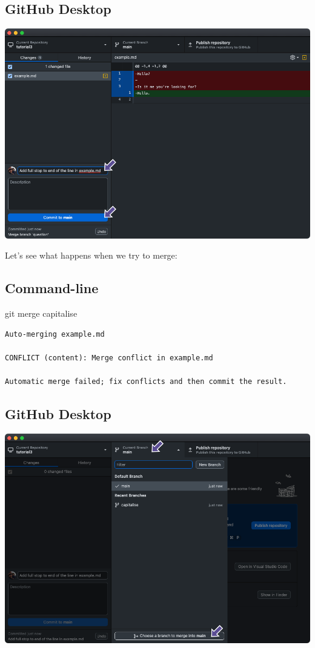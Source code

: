\documentclass[
  letterpaper,
  DIV=11,
  numbers=noendperiod]{scrartcl}
\newenvironment{Shaded}{\begin{snugshade}}{\end{snugshade}}
\newcommand{\FunctionTok}[1]{\textcolor[rgb]{0.28,0.35,0.67}{#1}}
\newcommand{\NormalTok}[1]{\textcolor[rgb]{0.00,0.23,0.31}{#1}}
\begin{document}
\subsection{GitHub Desktop}

\includegraphics{images/image50.png}

Let's see what happens when we try to merge:

\subsection{Command-line}

\begin{Shaded}
\begin{Highlighting}[]
\FunctionTok{git}\NormalTok{ merge capitalise}
\end{Highlighting}
\end{Shaded}

\begin{verbatim}
Auto-merging example.md

CONFLICT (content): Merge conflict in example.md

Automatic merge failed; fix conflicts and then commit the result.
\end{verbatim}

\subsection{GitHub Desktop}

\includegraphics{images/image51.png}
\end{document}
